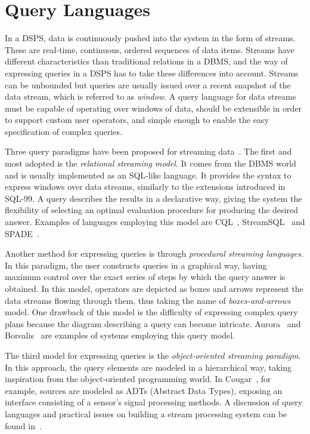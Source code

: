 \section{Query Languages}
\label{sec:querymod}

In a DSPS, data is continuously pushed into the system in the form of streams. These are real-time,
continuous, ordered sequences of data items. Streams have different characteristics than traditional
relations in a DBMS, and the way of expressing queries in a DSPS has to take these differences into
account. Streams can be unbounded but queries are usually issued over a recent snapshot of the data
stream, which is referred to as \textit{window}. A query language for data streams must be capable of
operating over windows of data, should be extensible in order to support custom user operators, and
simple enough to enable the easy specification of complex queries. 

Three query paradigms have been proposed for streaming data~\cite{dsm-issues}. The first and
most adopted is the \textit{relational streaming model}. It comes from the DBMS world and is
usually implemented as an SQL-like language. It provides the syntax to express windows over data streams,
similarly to the extensions introduced in SQL-99. A query describes the results in a declarative way,
giving the system the flexibility of selecting an optimal evaluation procedure for producing the desired
answer. Examples of languages employing this model are CQL~\cite{cql}, StreamSQL~\cite{streamsq} and SPADE~\cite{ss-spade}. 

Another method for expressing queries is through \textit{procedural streaming languages}. In this
paradigm, the user constructs queries in a graphical way, having maximum control over the exact series of
steps by which the query answer is obtained. In this model, operators are depicted as boxes and arrows
represent the data streams flowing through them, thus taking the name of \textit{boxes-and-arrows} model.
One drawback of this model is the difficulty of expressing complex query plans because the diagram
describing a query can become intricate. Aurora~\cite{aurora} and Borealis~\cite{borealis-design} are
examples of systems employing this query model.

The third model for expressing queries is the \textit{object-oriented streaming paradigm}. In this
approach, the query elements are modeled in a hierarchical way, taking inspiration from the
object-oriented programming world. In Cougar~\cite{cougar-adt}, for example, sources are modeled as ADTs
(Abstract Data Types), exposing an interface consisting of a sensor's signal processing methods. A discussion of
query languages and practical issues on building a stream processing system can be found
in~\cite{design-principles}.

